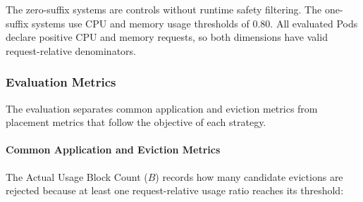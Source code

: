 \begin{table}[tbp]
    \centering
    \caption{Actual Usage Evictor Comparison Systems}
    \label{tab:actualusage4_matrix}
    \renewcommand{\arraystretch}{1.2}
\end{table}

The zero-suffix systems are controls without runtime safety filtering. The one-suffix systems use CPU and memory usage thresholds of \(0.80\). All evaluated Pods declare positive CPU and memory requests, so both dimensions have valid request-relative denominators.

\subsubsection{Evaluation Metrics}
\label{subsec:actualusage4_evaluationmetrics}
The evaluation separates common application and eviction metrics from placement metrics that follow the objective of each strategy.

\paragraph{Common Application and Eviction Metrics}
\label{subsubsec:actualusage4_metric_blocks}
The Actual Usage Block Count (\(B\)) records how many candidate evictions are rejected because at least one request-relative usage ratio reaches its threshold:

